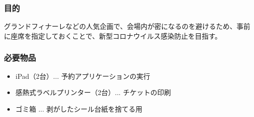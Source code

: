 \documentclass[dvipdfmx,jb5]{jarticle}
\begin{document}
 \subsubsection{目的}
 グランドフィナーレなどの人気企画で、会場内が密になるのを避けるため、事前に座席を指定しておくことで、新型コロナウイルス感染防止を目指す。
 \subsubsection{必要物品}
 \begin{itemize}
 \item iPad（2台）... 予約アプリケーションの実行
 \item 感熱式ラベルプリンター（2台）... チケットの印刷
 \item ゴミ箱 ... 剥がしたシール台紙を捨てる用
 \end{itemize}
\end{document}
